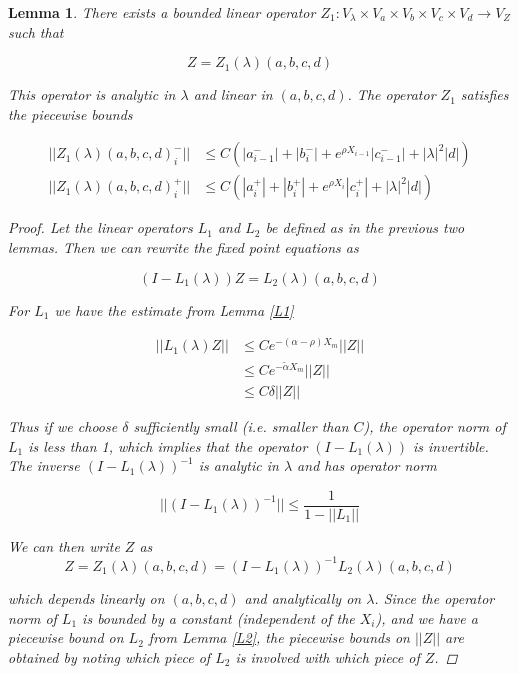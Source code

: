 \documentclass[12pt]{article}
\newtheorem{lemma}{Lemma}
\begin{document}
\begin{lemma}\label{Z1}
There exists a bounded linear operator $Z_1: V_\lambda \times V_a \times V_b \times V_c \times V_d \rightarrow V_Z$ such that 

\[
Z = Z_1(\lambda)(a,b,c,d)
\]

This operator is analytic in $\lambda$ and linear in $(a, b, c, d)$. The operator $Z_1$ satisfies the piecewise bounds

\begin{align*}
||Z_1(\lambda)(a,b,c,d)_i^-|| &\leq C ( |a_{i-1}^-| + |b_i^-| + e^{\rho X_{i-1}}|c_{i-1}^-| + |\lambda|^2 |d| ) \\
||Z_1(\lambda)(a,b,c,d)_i^+|| &\leq C ( |a_i^+| + |b_i^+| + e^{\rho X_i} |c_i^+| + |\lambda|^2 |d| )
\end{align*}

\begin{proof}
Let the linear operators $L_1$ and $L_2$ be defined as in the previous two lemmas. Then we can rewrite the fixed point equations as

\[
(I - L_1(\lambda))Z = L_2(\lambda)(a,b,c,d)
\]

For $L_1$ we have the estimate from Lemma \ref{L1}

\begin{align*}
||L_1(\lambda)Z|| &\leq C e^{-(\alpha - \rho)X_m}||Z|| \\
&\leq C e^{-\tilde{\alpha} X_m}||Z|| \\
&\leq C \delta ||Z||
\end{align*}

Thus if we choose $\delta$ sufficiently small (i.e. smaller than $C$), the operator norm of $L_1$ is less than 1, which implies that the operator $(I - L_1(\lambda))$ is invertible. The inverse $(I - L_1(\lambda))^{-1}$ is analytic in $\lambda$ and has operator norm 

\[
||(I - L_1(\lambda))^{-1}|| \leq \frac{1}{1 - ||L_1||}
\]

We can then write $Z$ as
\[
Z = Z_1(\lambda)(a,b,c,d) = (I - L_1(\lambda))^{-1} L_2(\lambda)(a,b,c,d)
\]

which depends linearly on $(a,b,c,d)$ and analytically on $\lambda$. Since the operator norm of $L_1$ is bounded by a constant (independent of the $X_i$), and we have a piecewise bound on $L_2$ from Lemma \ref{L2}, the piecewise bounds on $||Z||$ are obtained by noting which piece of $L_2$ is involved with which piece of $Z$.
\end{proof}
\end{lemma}
\end{document}
